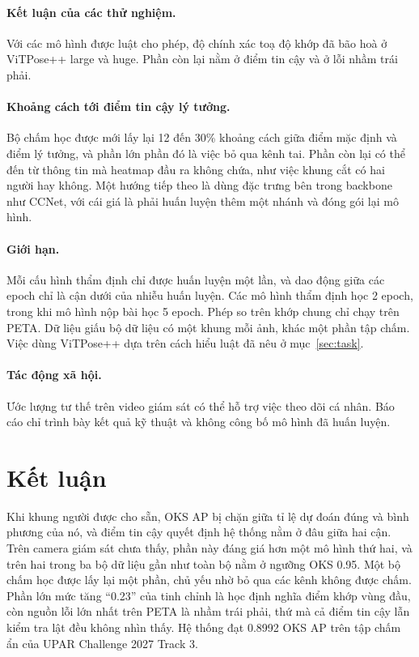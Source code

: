 \documentclass[11pt,a4paper]{article}
\begin{document}
\paragraph{Kết luận của các thử nghiệm.} Với các mô hình được luật cho phép, độ chính xác toạ độ khớp đã bão hoà ở ViTPose++ large và huge. Phần còn lại nằm ở điểm tin cậy và ở lỗi nhầm trái phải.

\paragraph{Khoảng cách tới điểm tin cậy lý tưởng.} Bộ chấm học được mới lấy lại 12 đến 30\% khoảng cách giữa điểm mặc định và điểm lý tưởng, và phần lớn phần đó là việc bỏ qua kênh tai. Phần còn lại có thể đến từ thông tin mà heatmap đầu ra không chứa, như việc khung cắt có hai người hay không. Một hướng tiếp theo là dùng đặc trưng bên trong backbone như CCNet, với cái giá là phải huấn luyện thêm một nhánh và đóng gói lại mô hình.

\paragraph{Giới hạn.} Mỗi cấu hình thẩm định chỉ được huấn luyện một lần, và dao động giữa các epoch chỉ là cận dưới của nhiễu huấn luyện. Các mô hình thẩm định học 2 epoch, trong khi mô hình nộp bài học 5 epoch. Phép so trên khớp chung chỉ chạy trên PETA. Dữ liệu giấu bộ dữ liệu có một khung mỗi ảnh, khác một phần tập chấm. Việc dùng ViTPose++ dựa trên cách hiểu luật đã nêu ở mục~\ref{sec:task}.

\paragraph{Tác động xã hội.} Ước lượng tư thế trên video giám sát có thể hỗ trợ việc theo dõi cá nhân. Báo cáo chỉ trình bày kết quả kỹ thuật và không công bố mô hình đã huấn luyện.

\section{Kết luận}

Khi khung người được cho sẵn, OKS AP bị chặn giữa tỉ lệ dự đoán đúng và bình phương của nó, và điểm tin cậy quyết định hệ thống nằm ở đâu giữa hai cận. Trên camera giám sát chưa thấy, phần này đáng giá hơn một mô hình thứ hai, và trên hai trong ba bộ dữ liệu gần như toàn bộ nằm ở ngưỡng OKS 0.95. Một bộ chấm học được lấy lại một phần, chủ yếu nhờ bỏ qua các kênh không được chấm. Phần lớn mức tăng ``0.23'' của tinh chỉnh là học định nghĩa điểm khớp vùng đầu, còn nguồn lỗi lớn nhất trên PETA là nhầm trái phải, thứ mà cả điểm tin cậy lẫn kiểm tra lật đều không nhìn thấy. Hệ thống đạt 0.8992 OKS AP trên tập chấm ẩn của UPAR Challenge 2027 Track 3.
\end{document}
